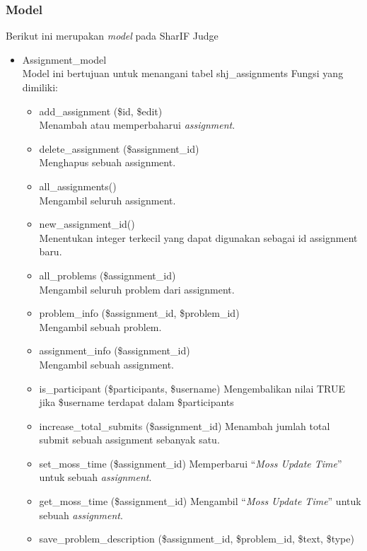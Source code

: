 \subsubsection{Model}
Berikut ini merupakan \textit{model} pada SharIF Judge
\begin{itemize}
    \item Assignment\_model\\
    Model ini bertujuan untuk menangani tabel shj\_assignments Fungsi yang dimiliki: 
    \begin{itemize}
        \item add\_assignment (\$id, \$edit)\\
        Menambah atau memperbaharui \textit{assignment}.
        \item delete\_assignment (\$assignment\_id) \\
Menghapus sebuah assignment.
        \item all\_assignments()\\
    Mengambil seluruh assignment.
        \item new\_assignment\_id()\\
 Menentukan integer terkecil yang dapat digunakan sebagai id assignment baru.
        \item all\_problems (\$assignment\_id)\\
 Mengambil seluruh problem dari assignment.
        \item problem\_info (\$assignment\_id, \$problem\_id)\\ 
        Mengambil sebuah problem.
        \item assignment\_info (\$assignment\_id)\\
 Mengambil sebuah assignment.
        \item is\_participant (\$participants, \$username)
\newpage
 Mengembalikan nilai TRUE jika \$username terdapat dalam \$participants 
        \item increase\_total\_submits (\$assignment\_id)
 Menambah jumlah total submit sebuah assignment sebanyak satu.
        \item set\_moss\_time (\$assignment\_id)
 Memperbarui ``\textit{Moss Update Time}'' untuk sebuah \textit{assignment}.
        \item get\_moss\_time (\$assignment\_id)
 Mengambil ``\textit{Moss Update Time}'' untuk sebuah \textit{assignment}.
        \item save\_problem\_description (\$assignment\_id, \$problem\_id, \$text, \$type)\\

\end{itemize}
\end{itemize}
